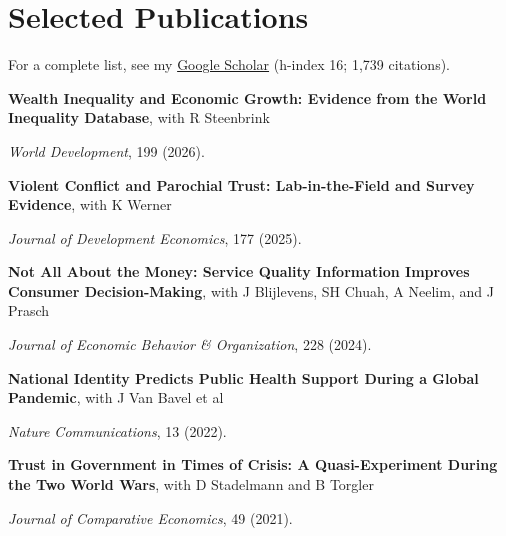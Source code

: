\documentclass[letterpaper]{article}
\renewenvironment{itemize}{
  \begin{list}{}{
    \setlength{\leftmargin}{1.5em}
  }
}{
  \end{list}
}
\begin{document}
\vspace{-0.05in}

\section*{Selected Publications}

For a complete list, see my \href{https://scholar.google.com.au/citations?user=pTSRJKcAAAAJ&hl=en}{Google Scholar} (h-index 16; 1,739 citations).

\vspace{0.05in}

\begin{itemize}

\item \textbf{Wealth Inequality and Economic Growth: Evidence from the World Inequality Database}, with R Steenbrink
\vspace{-0.05in}
\item \textit{World Development}, 199 (2026).

\medskip

\item \textbf{Violent Conflict and Parochial Trust: Lab-in-the-Field and Survey Evidence}, with K Werner
\vspace{-0.05in}
\item \textit{Journal of Development Economics}, 177 (2025).

\medskip

\item \textbf{Not All About the Money: Service Quality Information Improves Consumer Decision-Making}, with J Blijlevens, SH Chuah, A Neelim, and J Prasch
\vspace{-0.05in}
\item \textit{Journal of Economic Behavior \& Organization}, 228 (2024).

\medskip

\item \textbf{National Identity Predicts Public Health Support During a Global Pandemic}, with J Van Bavel et al
\vspace{-0.05in}
\item \textit{Nature Communications}, 13 (2022).

\medskip

\item \textbf{Trust in Government in Times of Crisis: A Quasi-Experiment During the Two World Wars}, with D Stadelmann and B Torgler
\vspace{-0.05in}
\item \textit{Journal of Comparative Economics}, 49 (2021).


\end{itemize}
\end{document}
